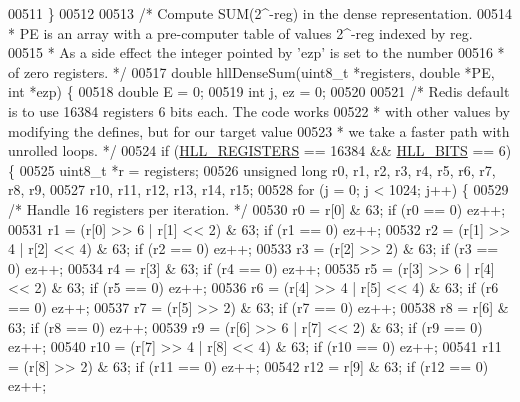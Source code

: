 \begin{DoxyCode}
{{00511 \}
00512 
00513 \textcolor{comment}{/* Compute SUM(2^-reg) in the dense representation.}
00514 \textcolor{comment}{ * PE is an array with a pre-computer table of values 2^-reg indexed by reg.}
00515 \textcolor{comment}{ * As a side effect the integer pointed by 'ezp' is set to the number}
00516 \textcolor{comment}{ * of zero registers. */}
00517 \textcolor{keywordtype}{double} hllDenseSum(uint8\_t *registers, \textcolor{keywordtype}{double} *PE, \textcolor{keywordtype}{int} *ezp) \{
00518     \textcolor{keywordtype}{double} E = 0;
00519     \textcolor{keywordtype}{int} j, ez = 0;
00520 
00521     \textcolor{comment}{/* Redis default is to use 16384 registers 6 bits each. The code works}
00522 \textcolor{comment}{     * with other values by modifying the defines, but for our target value}
00523 \textcolor{comment}{     * we take a faster path with unrolled loops. */}
00524     \textcolor{keywordflow}{if} (\hyperlink{hyperloglog_8c_aa053beb90136828dcb46545c7445fc36}{HLL\_REGISTERS} == 16384 && \hyperlink{hyperloglog_8c_a9023d37e2b4b782b2b922d9599894d14}{HLL\_BITS} == 6) \{
00525         uint8\_t *r = registers;
00526         \textcolor{keywordtype}{unsigned} \textcolor{keywordtype}{long} r0, r1, r2, r3, r4, r5, r6, r7, r8, r9,
00527                       r10, r11, r12, r13, r14, r15;
00528         \textcolor{keywordflow}{for} (j = 0; j < 1024; j++) \{
00529             \textcolor{comment}{/* Handle 16 registers per iteration. */}
00530             r0 = r[0] & 63; \textcolor{keywordflow}{if} (r0 == 0) ez++;
00531             r1 = (r[0] >> 6 | r[1] << 2) & 63; \textcolor{keywordflow}{if} (r1 == 0) ez++;
00532             r2 = (r[1] >> 4 | r[2] << 4) & 63; \textcolor{keywordflow}{if} (r2 == 0) ez++;
00533             r3 = (r[2] >> 2) & 63; \textcolor{keywordflow}{if} (r3 == 0) ez++;
00534             r4 = r[3] & 63; \textcolor{keywordflow}{if} (r4 == 0) ez++;
00535             r5 = (r[3] >> 6 | r[4] << 2) & 63; \textcolor{keywordflow}{if} (r5 == 0) ez++;
00536             r6 = (r[4] >> 4 | r[5] << 4) & 63; \textcolor{keywordflow}{if} (r6 == 0) ez++;
00537             r7 = (r[5] >> 2) & 63; \textcolor{keywordflow}{if} (r7 == 0) ez++;
00538             r8 = r[6] & 63; \textcolor{keywordflow}{if} (r8 == 0) ez++;
00539             r9 = (r[6] >> 6 | r[7] << 2) & 63; \textcolor{keywordflow}{if} (r9 == 0) ez++;
00540             r10 = (r[7] >> 4 | r[8] << 4) & 63; \textcolor{keywordflow}{if} (r10 == 0) ez++;
00541             r11 = (r[8] >> 2) & 63; \textcolor{keywordflow}{if} (r11 == 0) ez++;
00542             r12 = r[9] & 63; \textcolor{keywordflow}{if} (r12 == 0) ez++;
}}
\end{DoxyCode}
